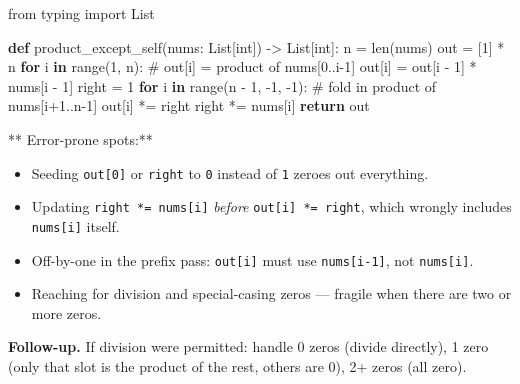 \documentclass[11pt]{article}
\providecommand{\tightlist}{\setlength{\itemsep}{1pt}\setlength{\parskip}{0pt}}
\newenvironment{Shaded}{\begin{snugshade}}{\end{snugshade}}
\newcommand{\BuiltInTok}[1]{\textcolor[rgb]{0.50,0.55,0.55}{#1}}
\newcommand{\CommentTok}[1]{\textcolor[rgb]{0.48,0.49,0.49}{#1}}
\newcommand{\ControlFlowTok}[1]{\textcolor[rgb]{0.99,0.74,0.29}{\textbf{#1}}}
\newcommand{\DecValTok}[1]{\textcolor[rgb]{0.96,0.45,0.00}{#1}}
\newcommand{\ImportTok}[1]{\textcolor[rgb]{0.15,0.68,0.38}{#1}}
\newcommand{\KeywordTok}[1]{\textcolor[rgb]{0.81,0.81,0.76}{\textbf{#1}}}
\newcommand{\NormalTok}[1]{\textcolor[rgb]{0.81,0.81,0.76}{#1}}
\newcommand{\OperatorTok}[1]{\textcolor[rgb]{0.81,0.81,0.76}{#1}}
\begin{document}
\begin{Shaded}
\begin{Highlighting}[]
\ImportTok{from}\NormalTok{ typing }\ImportTok{import}\NormalTok{ List}

\KeywordTok{def}\NormalTok{ product\_except\_self(nums: List[}\BuiltInTok{int}\NormalTok{]) }\OperatorTok{{-}\textgreater{}}\NormalTok{ List[}\BuiltInTok{int}\NormalTok{]:}
\NormalTok{    n }\OperatorTok{=} \BuiltInTok{len}\NormalTok{(nums)}
\NormalTok{    out }\OperatorTok{=}\NormalTok{ [}\DecValTok{1}\NormalTok{] }\OperatorTok{*}\NormalTok{ n}
    \ControlFlowTok{for}\NormalTok{ i }\KeywordTok{in} \BuiltInTok{range}\NormalTok{(}\DecValTok{1}\NormalTok{, n):          }\CommentTok{\# out[i] = product of nums[0..i{-}1]}
\NormalTok{        out[i] }\OperatorTok{=}\NormalTok{ out[i }\OperatorTok{{-}} \DecValTok{1}\NormalTok{] }\OperatorTok{*}\NormalTok{ nums[i }\OperatorTok{{-}} \DecValTok{1}\NormalTok{]}
\NormalTok{    right }\OperatorTok{=} \DecValTok{1}
    \ControlFlowTok{for}\NormalTok{ i }\KeywordTok{in} \BuiltInTok{range}\NormalTok{(n }\OperatorTok{{-}} \DecValTok{1}\NormalTok{, }\OperatorTok{{-}}\DecValTok{1}\NormalTok{, }\OperatorTok{{-}}\DecValTok{1}\NormalTok{): }\CommentTok{\# fold in product of nums[i+1..n{-}1]}
\NormalTok{        out[i] }\OperatorTok{*=}\NormalTok{ right}
\NormalTok{        right }\OperatorTok{*=}\NormalTok{ nums[i]}
    \ControlFlowTok{return}\NormalTok{ out}
\end{Highlighting}
\end{Shaded}

** Error-prone spots:**

\begin{itemize}
\tightlist
\item
  Seeding \texttt{out{[}0{]}} or \texttt{right} to \texttt{0} instead of \texttt{1} zeroes out everything.
\item
  Updating \texttt{right\ *=\ nums{[}i{]}} \emph{before} \texttt{out{[}i{]}\ *=\ right}, which wrongly includes \texttt{nums{[}i{]}} itself.
\item
  Off-by-one in the prefix pass: \texttt{out{[}i{]}} must use \texttt{nums{[}i-1{]}}, not \texttt{nums{[}i{]}}.
\item
  Reaching for division and special-casing zeros --- fragile when there are two or more zeros.
\end{itemize}

\textbf{Follow-up.} If division were permitted: handle 0 zeros (divide directly), 1 zero (only that slot is the product of the rest, others are 0), 2+ zeros (all zero).
\end{document}
